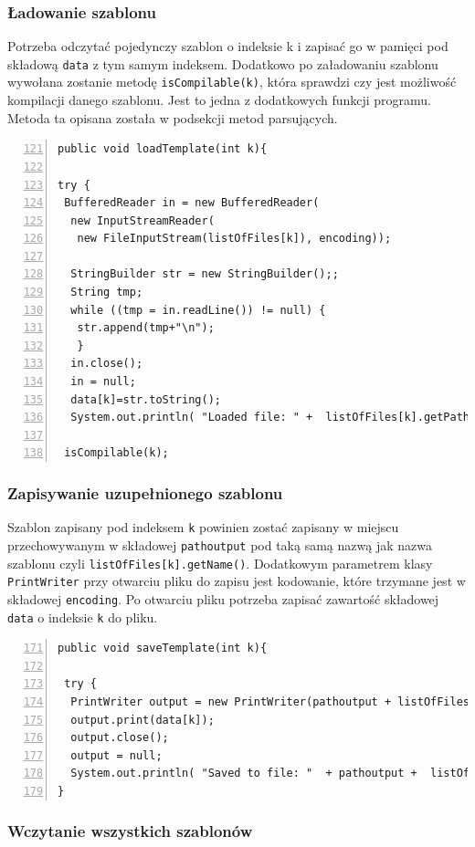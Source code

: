 \subsubsection*{Ładowanie szablonu}
Potrzeba odczytać pojedynczy szablon o indeksie k i zapisać go w pamięci pod składową \texttt{data} z tym samym indeksem. 
Dodatkowo po załadowaniu szablonu wywołana zostanie metodę  \texttt{isCompilable(k)}, która sprawdzi czy jest możliwość kompilacji danego szablonu. Jest to jedna z dodatkowych funkcji programu. Metoda ta opisana została w podsekcji metod parsujących. 
 \begin{lstlisting}[numbers=left,firstnumber=121]
public void loadTemplate(int k){
       
try {
 BufferedReader in = new BufferedReader(
  new InputStreamReader(
   new FileInputStream(listOfFiles[k]), encoding));
 
  StringBuilder str = new StringBuilder();;
  String tmp;
  while ((tmp = in.readLine()) != null) {
   str.append(tmp+"\n");
   }
  in.close();
  in = null;
  data[k]=str.toString();
  System.out.println( "Loaded file: " +  listOfFiles[k].getPath());
  
 isCompilable(k);
\end{lstlisting}

\subsubsection*{Zapisywanie uzupełnionego szablonu}

Szablon zapisany pod indeksem \texttt{k} powinien zostać zapisany w miejscu przechowywanym w składowej \texttt{pathoutput} pod taką samą nazwą jak nazwa szablonu czyli \texttt{listOfFiles[k].getName()}. Dodatkowym parametrem klasy \texttt{PrintWriter} przy otwarciu pliku do zapisu jest kodowanie, które trzymane jest w składowej \texttt{encoding}. Po otwarciu pliku potrzeba zapisać zawartość składowej \texttt{data} o indeksie \texttt{k} do pliku.

 \begin{lstlisting}[numbers=left,firstnumber=171]
public void saveTemplate(int k){
      
 try {
  PrintWriter output = new PrintWriter(pathoutput + listOfFiles[k].getName(),encoding);
  output.print(data[k]);
  output.close();
  output = null;
  System.out.println( "Saved to file: "  + pathoutput +  listOfFiles[k].getName() );
}
\end{lstlisting}

\subsubsection*{Wczytanie wszystkich szablonów}

